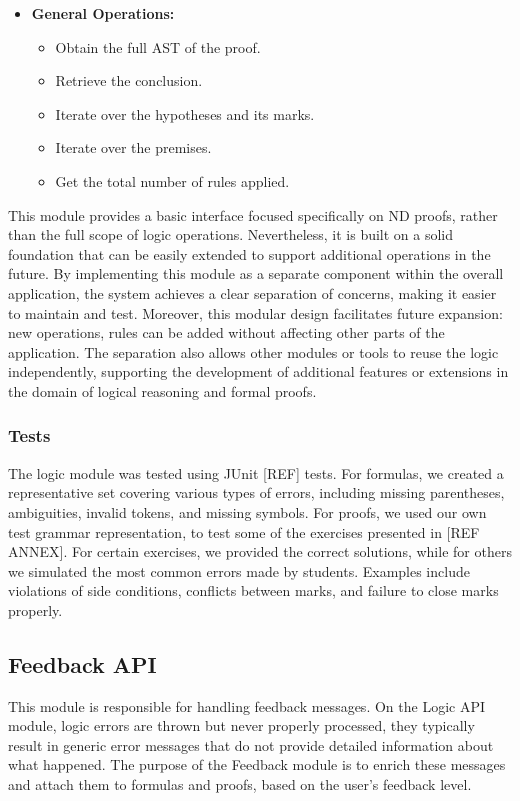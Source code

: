 \begin{itemize}[noitemsep, topsep=0pt]
    \item \textbf{General Operations:}
    \begin{itemize}[noitemsep, topsep=0pt]
        \item Obtain the full \gls{AST} of the proof.
        \item Retrieve the conclusion.
        \item Iterate over the hypotheses and its marks.
        \item Iterate over the premises.
        \item Get the total number of rules applied.
    \end{itemize}
\end{itemize}

This module provides a basic interface focused specifically on \gls{ND} proofs, rather than the full scope of logic operations. Nevertheless, it is built on a solid foundation that can be easily extended to support additional operations in the future. By implementing this module as a separate component within the overall application, the system achieves a clear separation of concerns, making it easier to maintain and test. Moreover, this modular design facilitates future expansion: new operations, rules can be added without affecting other parts of the application. The separation also allows other modules or tools to reuse the logic independently, supporting the development of additional features or extensions in the domain of logical reasoning and formal proofs.

\subsubsection{Tests}

The logic module was tested using JUnit [REF] tests. For formulas, we created a representative set covering various types of errors, including missing parentheses, ambiguities, invalid tokens, and missing symbols. For proofs, we used our own test grammar representation, to test some of the exercises presented in [REF ANNEX]. For certain exercises, we provided the correct solutions, while for others we simulated the most common errors made by students. Examples include violations of side conditions, conflicts between marks, and failure to close marks properly.


\subsection{Feedback API}
This module is responsible for handling feedback messages. On the Logic API module, logic errors are thrown but never properly processed, they typically result in generic error messages that do not provide detailed information about what happened. The purpose of the Feedback module is to enrich these messages and attach them to formulas and proofs, based on the user's feedback level.  

